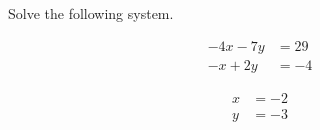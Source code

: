 
\begin{question}
Solve the following system.

\[\begin{aligned}
- 4 x - 7 y&=29\\
- x + 2 y&=-4
\end{aligned}\]
\end{question}

\begin{solution}
\[\begin{aligned}
x&=-2\\
y&=-3
\end{aligned}\]
\end{solution}

